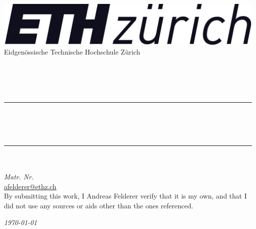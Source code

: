 \begin{titlepage}
	\centering
    \includegraphics[scale = 0.15]{figures/ETHZ_logo_black.png}\\[0.5 cm]	%
    {\Large Eidgenössische Technische Hochschule Zürich}\\[1.5 cm]
	
	{\large\ethfont \docLectureNumber}\\[0.8em]	%
	{\Large \bfseries\ethbfont \docLectureTitle}\\[1em]	%
	{\large \docTeacher}\\[0.3em]
	{\itshape \docTerm }\\[1cm]
	\rule{\linewidth}{0.2 mm} \\[0.5 cm]

	{\huge\bfseries\ethbfont \docTitle}\\[1em]
	{\Large\ethitfont \docSubTitle}\\
	\rule{\linewidth}{0.2 mm} \\[1.5 cm]
	
	{\Large\itshape \docAuthor }\\[0.3em]
	{\itshape Matr. Nr. \docMatNr }\\
	\href{mailto:afelderer@ethz.ch}{afelderer@ethz.ch} \\[1 cm]

    By submitting this work, I Andreas Felderer verify that it is my own, and that I did not use any sources or aids other than the ones referenced.

	\vfill


	{\itshape \today}
\end{titlepage}
